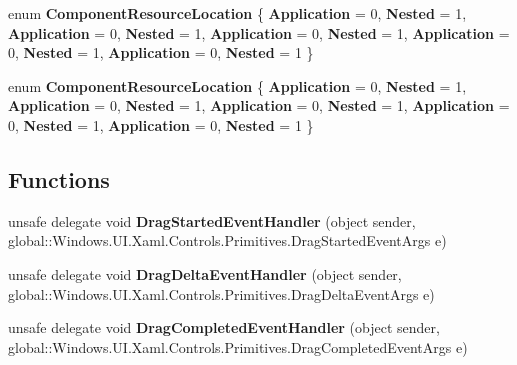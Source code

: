 \begin{DoxyCompactItemize}
enum {\bfseries Component\+Resource\+Location} \{ \newline
{\bfseries Application} = 0, 
{\bfseries Nested} = 1, 
{\bfseries Application} = 0, 
{\bfseries Nested} = 1, 
\newline
{\bfseries Application} = 0, 
{\bfseries Nested} = 1, 
{\bfseries Application} = 0, 
{\bfseries Nested} = 1, 
\newline
{\bfseries Application} = 0, 
{\bfseries Nested} = 1
 \}
\item 
\mbox{\label{namespace_windows_1_1_u_i_1_1_xaml_1_1_controls_1_1_primitives_ab75c957e426602c7b96043a866a2231c}} 
enum {\bfseries Component\+Resource\+Location} \{ \newline
{\bfseries Application} = 0, 
{\bfseries Nested} = 1, 
{\bfseries Application} = 0, 
{\bfseries Nested} = 1, 
\newline
{\bfseries Application} = 0, 
{\bfseries Nested} = 1, 
{\bfseries Application} = 0, 
{\bfseries Nested} = 1, 
\newline
{\bfseries Application} = 0, 
{\bfseries Nested} = 1
 \}
\end{DoxyCompactItemize}
\subsection*{Functions}
\begin{DoxyCompactItemize}
\item 
\mbox{\label{namespace_windows_1_1_u_i_1_1_xaml_1_1_controls_1_1_primitives_a0ece1b72f34dcc0348ae7f7fcc569dec}} 
unsafe delegate void {\bfseries Drag\+Started\+Event\+Handler} (object sender, global\+::\+Windows.\+U\+I.\+Xaml.\+Controls.\+Primitives.\+Drag\+Started\+Event\+Args e)
\item 
\mbox{\label{namespace_windows_1_1_u_i_1_1_xaml_1_1_controls_1_1_primitives_ad8987ea0346cfb3f4213ee3c5a0bb426}} 
unsafe delegate void {\bfseries Drag\+Delta\+Event\+Handler} (object sender, global\+::\+Windows.\+U\+I.\+Xaml.\+Controls.\+Primitives.\+Drag\+Delta\+Event\+Args e)
\item 
\mbox{\label{namespace_windows_1_1_u_i_1_1_xaml_1_1_controls_1_1_primitives_a39a75c7b35c80fc1849399bdd189048f}} 
unsafe delegate void {\bfseries Drag\+Completed\+Event\+Handler} (object sender, global\+::\+Windows.\+U\+I.\+Xaml.\+Controls.\+Primitives.\+Drag\+Completed\+Event\+Args e)
\end{DoxyCompactItemize}
